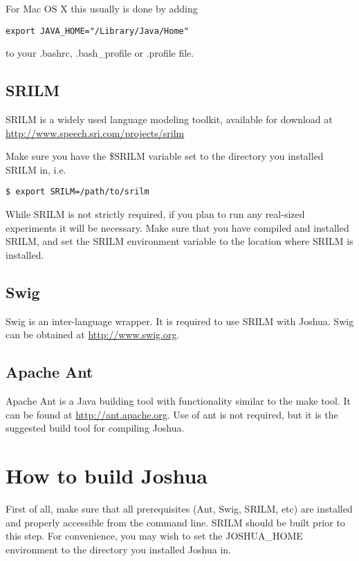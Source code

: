 For Mac OS X this usually is done by adding

\begin{verbatim}
export JAVA_HOME="/Library/Java/Home"
\end{verbatim}

to your .bashrc, .bash\_profile or .profile file.

\subsection{SRILM}

SRILM is a widely used language modeling toolkit, available for
download at \url{http://www.speech.sri.com/projects/srilm}

Make sure you have the \$SRILM variable set to the directory you
installed SRILM in, i.e.

\begin{verbatim}
$ export SRILM=/path/to/srilm
\end{verbatim}

While SRILM is not strictly required, if you plan to run any real-sized experiments it will be necessary. Make sure that you have compiled and installed SRILM, and set the SRILM environment variable to the location where SRILM is installed.

\subsection{Swig}

Swig is an inter-language wrapper. It is required to use SRILM with Joshua. Swig can be obtained at \url{http://www.swig.org}. 

\subsection{Apache Ant}

Apache Ant is a Java building tool with functionality similar to the
make tool. It can be found at \url{http://ant.apache.org}. Use of ant is not required, but it is the suggested build tool for compiling Joshua.

      
\section{How to build Joshua}
\label{sec:build-joshua}

First of all, make sure that all prerequisites (Ant, Swig, SRILM, etc) are installed and properly accessible from the command line. SRILM should be built prior
to this step. For convenience, you may wish to set the JOSHUA\_HOME 
environment to the directory you installed Joshua in.

